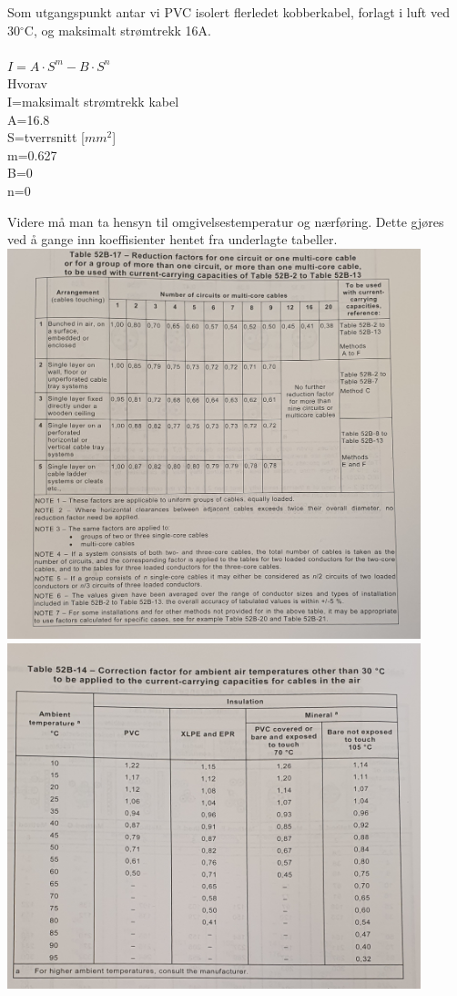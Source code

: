 \documentclass{article}
\begin{document}
Som utgangspunkt antar vi PVC isolert flerledet kobberkabel, forlagt i luft ved 30$^\circ$C, og maksimalt strømtrekk 16A. 
\\
\\
$I=A\cdot S^m - B\cdot S^n$\\
Hvorav\\
I=maksimalt strømtrekk kabel\\
A=16.8\\
S=tverrsnitt [$mm^2$]\\
m=0.627\\
B=0\\
n=0


Videre må man ta hensyn til omgivelsestemperatur og nærføring. Dette gjøres ved å gange inn koeffisienter hentet fra underlagte tabeller.
\\
\includegraphics[width=0.9\textwidth]{bilder/close.jpg}\\
\includegraphics[width=0.9\textwidth]{bilder/temp.jpg}\\
\end{document}
